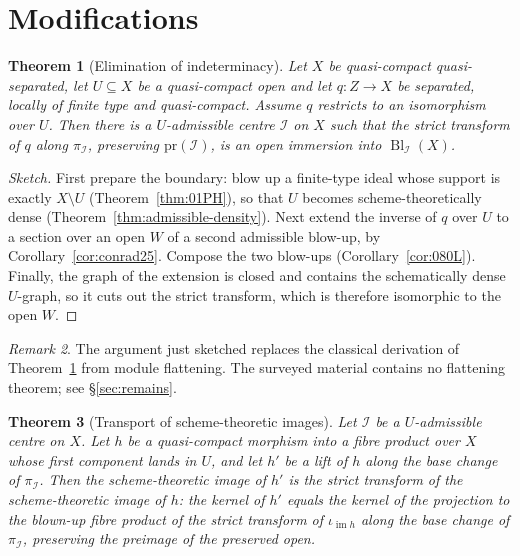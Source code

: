 \documentclass[11pt,a4paper]{article}
\theoremstyle{plain}
\newtheorem{theorem}{Theorem}[section]
\theoremstyle{definition}
\theoremstyle{remark}
\newtheorem{remark}[theorem]{Remark}
\newcommand{\Bl}{\operatorname{Bl}}
\newcommand{\sI}{\mathcal{I}}
\newcommand{\im}{\operatorname{im}}
\newcommand{\qcqs}{quasi-compact quasi-separated}
\begin{document}
\section{Modifications}
\label{sec:modifications}

\begin{theorem}[Elimination of indeterminacy]
\label{thm:081S}
Let $X$ be \qcqs{}, let $U\subseteq X$ be a quasi-compact open and let
$q\colon Z\to X$ be separated, locally of finite type and quasi-compact.
Assume $q$ restricts to an isomorphism over $U$. Then there is a
$U$-admissible centre $\sI$ on $X$ such that the strict transform of $q$ along
$\pi_\sI$, preserving $\mathrm{pr}(\sI)$, is an open immersion into
$\Bl_\sI(X)$.
\end{theorem}

\begin{proof}[Sketch]
First prepare the boundary: blow up a finite-type ideal whose support is
exactly $X\setminus U$ (Theorem~\ref{thm:01PH}), so that $U$ becomes
scheme-theoretically dense (Theorem~\ref{thm:admissible-density}). Next extend
the inverse of $q$ over $U$ to a section over an open $W$ of a second
admissible blow-up, by Corollary~\ref{cor:conrad25}. Compose the two blow-ups
(Corollary~\ref{cor:080L}). Finally, the graph of the extension is closed and
contains the schematically dense $U$-graph, so it cuts out the strict
transform, which is therefore isomorphic to the open $W$.
\end{proof}

\begin{remark}
\label{rem:route}
The argument just sketched replaces the classical derivation of
Theorem~\ref{thm:081S} from module flattening. The surveyed material contains
no flattening theorem; see \S\ref{sec:remains}.
\end{remark}

\begin{theorem}[Transport of scheme-theoretic images]
\label{thm:0F3Y}
Let $\sI$ be a $U$-admissible centre on $X$. Let $h$ be a quasi-compact
morphism into a fibre product over $X$ whose first component lands in $U$, and
let $h'$ be a lift of $h$ along the base change of $\pi_\sI$. Then the
scheme-theoretic image of $h'$ is the strict transform of the
scheme-theoretic image of $h$: the kernel of $h'$ equals the kernel of the
projection to the blown-up fibre product of the strict transform of
$\iota_{\im h}$ along the base change of $\pi_\sI$, preserving the preimage of
the preserved open.
\end{theorem}
\end{document}
